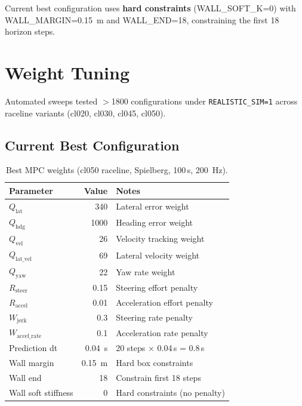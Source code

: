 \documentclass[11pt,a4paper]{article}
\begin{document}
Current best configuration uses \textbf{hard constraints} (WALL\_SOFT\_K=0) with WALL\_MARGIN=\SI{0.15}{\metre} and WALL\_END=18, constraining the first 18 horizon steps.

\section{Weight Tuning}
\label{sec:weight_tuning}

Automated sweeps tested $>$1800 configurations under \texttt{REALISTIC\_SIM=1} across raceline variants (cl020, cl030, cl045, cl050).

\subsection{Current Best Configuration}
\begin{table}[H]
\centering
\caption{Best MPC weights (cl050 raceline, Spielberg, 100\,s, \SI{200}{\hertz}).}
\label{tab:best_weights}
\begin{tabular}{@{}lrl@{}}
\toprule
\textbf{Parameter} & \textbf{Value} & \textbf{Notes} \\
\midrule
$Q_\text{lat}$           & 340    & Lateral error weight \\
$Q_\text{hdg}$           & 1000   & Heading error weight \\
$Q_\text{vel}$           & 26     & Velocity tracking weight \\
$Q_\text{lat\_vel}$      & 69     & Lateral velocity weight \\
$Q_\text{yaw}$           & 22     & Yaw rate weight \\
$R_\text{steer}$         & 0.15   & Steering effort penalty \\
$R_\text{accel}$         & 0.01   & Acceleration effort penalty \\
$W_\text{jerk}$          & 0.3    & Steering rate penalty \\
$W_\text{accel\_rate}$   & 0.1    & Acceleration rate penalty \\
Prediction dt             & \SI{0.04}{\second} & 20 steps $\times$ 0.04\,s = 0.8\,s \\
Wall margin              & \SI{0.15}{\metre} & Hard box constraints \\
Wall end                 & 18     & Constrain first 18 steps \\
Wall soft stiffness      & 0      & Hard constraints (no penalty) \\
\bottomrule
\end{tabular}
\end{table}
\end{document}
